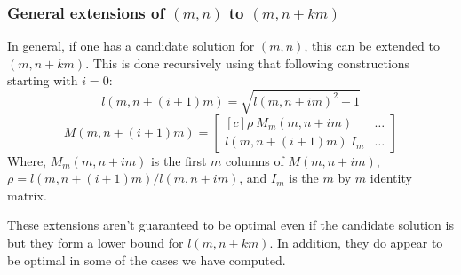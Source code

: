 \documentclass[12pt,titlepage]{article}
\begin{document}
\subsubsection{General extensions of $(m,n)$ to $(m,n+km)$}
In general, if one has a candidate solution for $(m,n)$, this can be extended
to $(m,n+km)$.  This is done recursively using that following constructions
starting with $i = 0$:
\begin{equation*}
l(m,n+(i+1)m) = \sqrt{l(m,n+im)^2 + 1}
\end{equation*}
\begin{equation*}
M(m,n+(i+1)m) =
\begin{bmatrix*}[c]
\rho~M_m(m,n+im)  & \ldots \\
l(m,n+(i+1)m)~I_m & \ldots
\end{bmatrix*}
\end{equation*}
Where, $M_m(m,n+im)$ is the first $m$ columns of $M(m,n+im)$,
$\rho = l(m,n+(i+1)m)/l(m,n+im)$, and $I_m$ is the $m$ by $m$ identity matrix.

These extensions aren't guaranteed to be optimal even if the candidate
solution is but they form a lower bound for $l(m,n+km)$.  In addition, they do
appear to be optimal in some of the cases we have computed.
\end{document}
